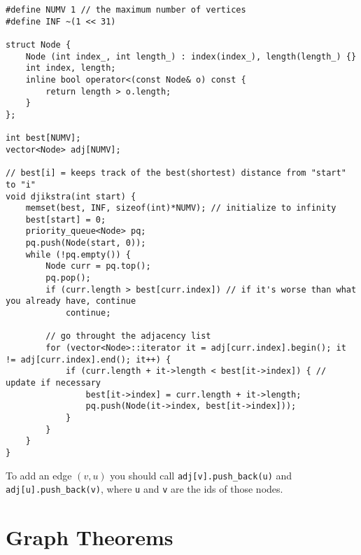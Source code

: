 \documentclass[a4paper,final,8pt]{article}
\begin{document}
\begin{lstlisting}
#define NUMV 1 // the maximum number of vertices
#define INF ~(1 << 31)

struct Node {
    Node (int index_, int length_) : index(index_), length(length_) {}
    int index, length;
    inline bool operator<(const Node& o) const {
        return length > o.length;
    }
};

int best[NUMV];
vector<Node> adj[NUMV];

// best[i] = keeps track of the best(shortest) distance from "start" to "i"
void djikstra(int start) {
    memset(best, INF, sizeof(int)*NUMV); // initialize to infinity
    best[start] = 0;
    priority_queue<Node> pq;
    pq.push(Node(start, 0));
    while (!pq.empty()) {
        Node curr = pq.top();
        pq.pop();
        if (curr.length > best[curr.index]) // if it's worse than what you already have, continue
            continue;

        // go throught the adjacency list
        for (vector<Node>::iterator it = adj[curr.index].begin(); it != adj[curr.index].end(); it++) {
            if (curr.length + it->length < best[it->index]) { // update if necessary
                best[it->index] = curr.length + it->length;
                pq.push(Node(it->index, best[it->index]));
            }
        }
    }
}
\end{lstlisting}

To add an edge $(v,u)$ you should call \texttt{adj[v].push\_back(u)} and
\texttt{adj[u].push\_back(v)}, where \texttt{u} and \texttt{v} are the ids of
those nodes.

\section{Graph Theorems}
\end{document}
